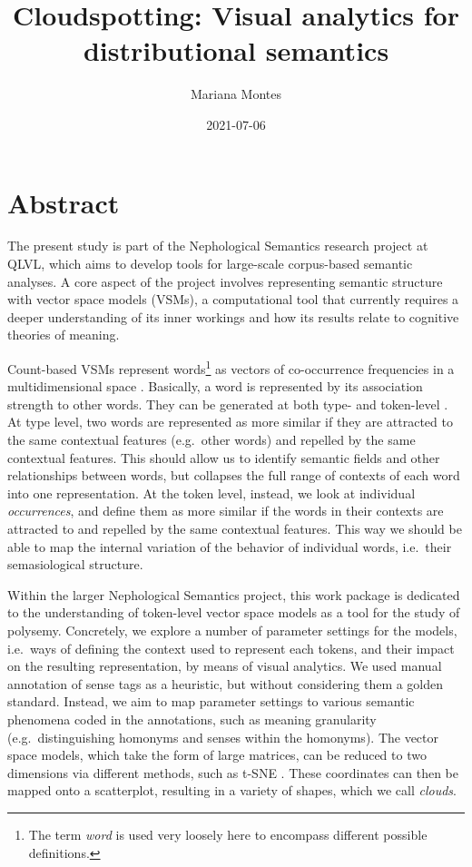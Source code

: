 \documentclass[
]{book}
\title{Cloudspotting: Visual analytics for distributional semantics}
\author{Mariana Montes}
\date{2021-07-06}
\begin{document}
\maketitle

{
\setcounter{tocdepth}{1}
\tableofcontents
}
\hypertarget{abstract}{%
\chapter*{Abstract}\label{abstract}}

The present study is part of the Nephological Semantics research project at QLVL,
which aims to develop tools for large-scale corpus-based semantic analyses.
A core aspect of the project involves representing semantic structure with vector space models (VSMs),
a computational tool that currently requires a deeper understanding of its inner workings
and how its results relate to cognitive theories of meaning.

Count-based VSMs represent words\footnote{The term \emph{word} is used very loosely here to encompass different possible definitions.} as vectors of co-occurrence frequencies in a multidimensional space
\autocite{turney.pantel_2010,lenci_2018}. Basically, a word is represented by
its association strength to other words.
They can be generated at both type- and token-level \autocite{heylen.etal_2012,heylen.etal_2015,de_pascale_2019}.
At type level, two words are represented as more similar if they are attracted to the same
contextual features (e.g.~other words) and repelled by the same contextual features. This should
allow us to identify semantic fields and other relationships between words, but collapses the full
range of contexts of each word into one representation.
At the token level, instead, we look at individual \emph{occurrences}, and define them as more similar if
the words in their contexts are attracted to and repelled by the same contextual features.
This way we should be able to map the internal variation of the behavior of individual words,
i.e.~their semasiological structure.

Within the larger Nephological Semantics project, this work package is dedicated
to the understanding of token-level vector space models as a tool
for the study of polysemy. Concretely, we explore a number of parameter settings for the models,
i.e.~ways of defining the context used to represent each tokens, and their impact on the
resulting representation, by means of visual analytics.
We used manual annotation of sense tags as a heuristic, but without
considering them a golden standard. Instead, we aim to map parameter settings to various
semantic phenomena coded in the annotations, such as
meaning granularity (e.g.~distinguishing homonyms and senses within the homonyms).
The vector space models, which take the form of large matrices,
can be reduced to two dimensions via different methods,
such as t-SNE \autocite{Rtsne2008,Rtsne2015}.
These coordinates can then be mapped onto a scatterplot, resulting in a variety of
shapes, which we call \emph{clouds}.
\end{document}
